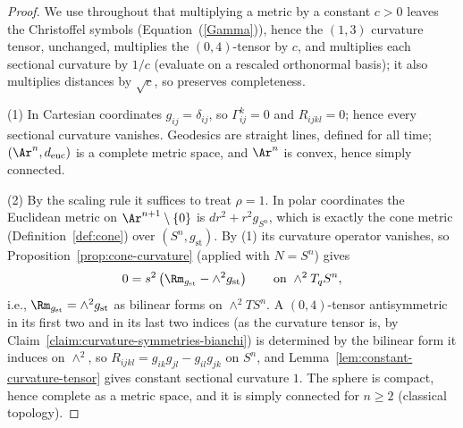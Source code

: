 \begin{proof}
\sketch
{}
We use throughout that multiplying a metric by a constant $c>0$
leaves the Christoffel symbols (Equation~(\ref{Gamma})), hence the
$(1,3)$ curvature tensor, unchanged, multiplies the $(0,4)$-tensor
by $c$, and multiplies each sectional curvature by $1/c$
(evaluate on a rescaled orthonormal basis); it also multiplies
distances by $\sqrt c$, so preserves completeness.

(1) In Cartesian coordinates $g_{ij}=\delta_{ij}$, so
$\Gamma^k_{ij}=0$ and $R_{ijkl}=0$; hence every sectional
curvature vanishes. Geodesics are straight lines, defined for all
time; $(\Ar^n,d_{\mathrm{euc}})$ is a complete metric space, and
$\Ar^n$ is convex, hence simply connected.

(2) By the scaling rule it suffices to treat $\rho=1$. In polar
coordinates the Euclidean metric on $\Ar^{n+1}\setminus\{0\}$ is
$dr^2+r^2g_{S^n}$, which is exactly the cone metric
(Definition~\ref{def:cone}) over $(S^n,g_{\mathrm{st}})$. By (1)
its curvature operator vanishes, so
Proposition~\ref{prop:cone-curvature} (applied with $N=S^n$) gives
$$0=s^2\left(\Rm_{g_{\mathrm{st}}}-\wedge^2g_{\mathrm{st}}\right)
\qquad\text{on }\wedge^2T_qS^n,$$
i.e., $\Rm_{g_{\mathrm{st}}}=\wedge^2g_{\mathrm{st}}$ as bilinear
forms on $\wedge^2TS^n$. A $(0,4)$-tensor antisymmetric in its
first two and in its last two indices (as the curvature tensor is,
by Claim~\ref{claim:curvature-symmetries-bianchi}) is determined by
the bilinear form it induces on $\wedge^2$, so
$R_{ijkl}=g_{ik}g_{jl}-g_{il}g_{jk}$ on $S^n$, and
Lemma~\ref{lem:constant-curvature-tensor} gives constant sectional
curvature $1$. The sphere is compact, hence complete as a metric
space, and it is simply connected for $n\ge2$ (classical
topology).


\end{proof}
